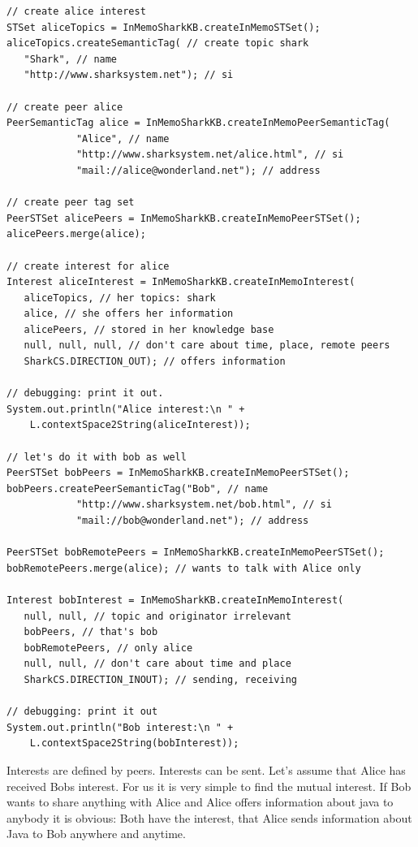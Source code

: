 \begin{verbatim}
// create alice interest
STSet aliceTopics = InMemoSharkKB.createInMemoSTSet();
aliceTopics.createSemanticTag( // create topic shark
   "Shark", // name
   "http://www.sharksystem.net"); // si

// create peer alice
PeerSemanticTag alice = InMemoSharkKB.createInMemoPeerSemanticTag(
            "Alice", // name
            "http://www.sharksystem.net/alice.html", // si
            "mail://alice@wonderland.net"); // address

// create peer tag set
PeerSTSet alicePeers = InMemoSharkKB.createInMemoPeerSTSet();
alicePeers.merge(alice);

// create interest for alice
Interest aliceInterest = InMemoSharkKB.createInMemoInterest(
   aliceTopics, // her topics: shark
   alice, // she offers her information
   alicePeers, // stored in her knowledge base
   null, null, null, // don't care about time, place, remote peers
   SharkCS.DIRECTION_OUT); // offers information

// debugging: print it out.
System.out.println("Alice interest:\n " +
    L.contextSpace2String(aliceInterest));

// let's do it with bob as well
PeerSTSet bobPeers = InMemoSharkKB.createInMemoPeerSTSet();
bobPeers.createPeerSemanticTag("Bob", // name
            "http://www.sharksystem.net/bob.html", // si
            "mail://bob@wonderland.net"); // address

PeerSTSet bobRemotePeers = InMemoSharkKB.createInMemoPeerSTSet();
bobRemotePeers.merge(alice); // wants to talk with Alice only

Interest bobInterest = InMemoSharkKB.createInMemoInterest(
   null, null, // topic and originator irrelevant
   bobPeers, // that's bob
   bobRemotePeers, // only alice
   null, null, // don't care about time and place
   SharkCS.DIRECTION_INOUT); // sending, receiving

// debugging: print it out
System.out.println("Bob interest:\n " +
    L.contextSpace2String(bobInterest));
\end{verbatim}

Interests are defined by peers. Interests can be sent. Let's assume that Alice has received Bobs interest. For us it is very simple to find the mutual interest. If Bob wants to share anything with Alice and Alice offers information about java to anybody it is obvious: Both have the interest, that Alice sends information about Java to Bob anywhere and anytime.

